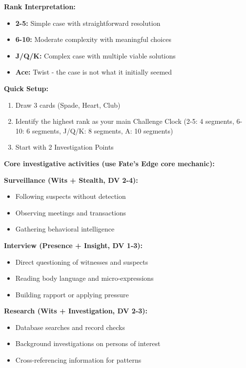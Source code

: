 \documentclass[11pt]{article}
\begin{document}
\textbf{Rank Interpretation:}
\begin{itemize}
    \item \textbf{2-5:} Simple case with straightforward resolution
    \item \textbf{6-10:} Moderate complexity with meaningful choices
    \item \textbf{J/Q/K:} Complex case with multiple viable solutions
    \item \textbf{Ace:} Twist - the case is not what it initially seemed
\end{itemize}

\textbf{Quick Setup:}
\begin{enumerate}
    \item Draw 3 cards (Spade, Heart, Club)
    \item Identify the highest rank as your main Challenge Clock (2-5: 4 segments, 6-10: 6 segments, J/Q/K: 8 segments, A: 10 segments)
    \item Start with 2 Investigation Points
\end{enumerate}

\textbf{Core investigative activities (use Fate's Edge core mechanic):}

\textbf{Surveillance (Wits + Stealth, DV 2-4):}
\begin{itemize}
    \item Following suspects without detection
    \item Observing meetings and transactions
    \item Gathering behavioral intelligence
\end{itemize}

\textbf{Interview (Presence + Insight, DV 1-3):}
\begin{itemize}
    \item Direct questioning of witnesses and suspects
    \item Reading body language and micro-expressions
    \item Building rapport or applying pressure
\end{itemize}

\textbf{Research (Wits + Investigation, DV 2-3):}
\begin{itemize}
    \item Database searches and record checks
    \item Background investigations on persons of interest
    \item Cross-referencing information for patterns
\end{itemize}
\end{document}
